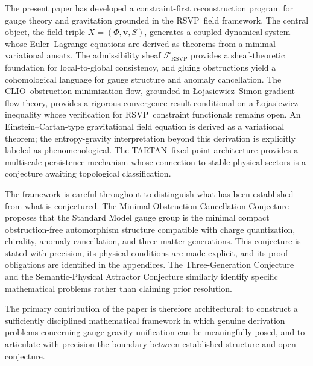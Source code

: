 \documentclass[12pt,a4paper]{article}
\newcommand{\RSVP}{\textrm{RSVP}}
\newcommand{\CLIO}{\textrm{CLIO}}
\newcommand{\TARTAN}{\textrm{TARTAN}}
\newcommand{\Sheaf}{\mathcal{F}}
\begin{document}
The present paper has developed a constraint-first reconstruction program for
gauge theory and gravitation grounded in the \RSVP\ field framework. The central
object, the field triple $X=(\Phi,\mathbf{v},S)$, generates a coupled dynamical
system whose Euler--Lagrange equations are derived as theorems from a minimal
variational ansatz. The admissibility sheaf $\Sheaf_\RSVP$ provides a
sheaf-theoretic foundation for local-to-global consistency, and gluing
obstructions yield a cohomological language for gauge structure and anomaly
cancellation. The \CLIO\ obstruction-minimization flow, grounded in
Łojasiewicz--Simon gradient-flow theory, provides a rigorous convergence result
conditional on a Łojasiewicz inequality whose verification for \RSVP\ constraint
functionals remains open. An Einstein--Cartan-type gravitational field equation
is derived as a variational theorem; the entropy-gravity interpretation beyond
this derivation is explicitly labeled as phenomenological. The \TARTAN\
fixed-point architecture provides a multiscale persistence mechanism whose
connection to stable physical sectors is a conjecture awaiting topological
classification.

The framework is careful throughout to distinguish what has been established
from what is conjectured. The Minimal Obstruction-Cancellation Conjecture
proposes that the Standard Model gauge group is the minimal compact
obstruction-free automorphism structure compatible with charge quantization,
chirality, anomaly cancellation, and three matter generations. This conjecture
is stated with precision, its physical conditions are made explicit, and its
proof obligations are identified in the appendices. The Three-Generation
Conjecture and the Semantic-Physical Attractor Conjecture similarly identify
specific mathematical problems rather than claiming prior resolution.

The primary contribution of the paper is therefore architectural: to construct
a sufficiently disciplined mathematical framework in which genuine derivation
problems concerning gauge-gravity unification can be meaningfully posed, and
to articulate with precision the boundary between established structure and
open conjecture.
\end{document}
